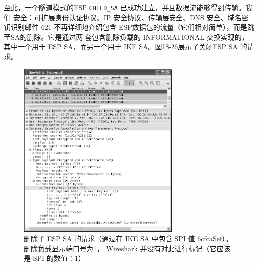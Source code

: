 至此，一个隧道模式的ESP \verb|CHILD_SA| 已成功建立，并且数据流能够得到传输。我们
安全：可扩展身份认证协议、IP 安全协议、传输层安全、DNS 安全、域名密钥识别邮件 621
不再详细地介绍包含 ESP数据包的流量（它们相对简单），而是跳至SA的删除。它是通过两
套包含删除负载的 INFORMATIONAL 交换实现的，其中一个用于 ESP SA，而另一个用于
IKE SA。图18-26展示了关闭ESP SA 的请求。
\begin{figure}[!htb]
    \centering
	\includegraphics[width=0.7\textwidth]{imgs/18/18-26.png}
	\caption{删除子 ESP SA 的请求（通过在 IKE SA 中包含 SPI 值 6cfcaSef）。删除负载显示端口号为1，
            Wireshark 并没有对此进行标记（它应该是 SPI 的数值：1）}
\end{figure}

